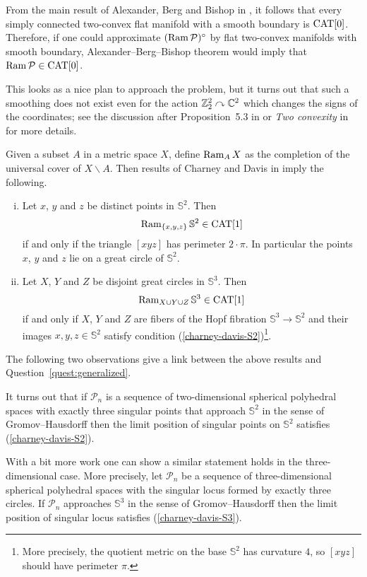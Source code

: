 \documentclass[oneside,a4paper]{article}
\begin{document}
From the main result of Alexander, Berg and Bishop  in \cite{ABB},
it follows that every simply connected two-convex flat manifold with a smooth boundary is $\mathrm{CAT}[0]$. Therefore, if one could approximate  $(\mathop{\rm Ram}\nolimits  \mathcal{P})^\circ$ by flat two-convex manifolds with smooth boundary, Alexander--Berg--Bishop theorem would imply that $\Ram  \mathcal{P}\z\in\CAT[0]$.

This looks as a nice plan to approach the problem, but it turns out that such a smoothing does not exist even for the action $\mathbb{Z}_2^2\curvearrowright\mathbb{C}^2$ which changes the signs of the coordinates;
see the discussion after Proposition~5.3 in \cite{panov-petrunin}
or \emph{Two convexity} in \cite{petrunin-orthodox} for more details.

Given a subset $A$ in a metric space $X$,
define $\mathop{\rm Ram}\nolimits_A X$ as  the completion of the universal cover of $X\backslash A$.
Then results of  Charney and Davis in \cite{charney-davis-93} imply the following.
\begin{enumerate}[(i)]
\item\label{charney-davis-S2} Let $x$, $y$ and $z$ be distinct points in $\mathbb{S}^2$.
Then
$$\mathop{\rm Ram}\nolimits_{\{x,y,z\}}\mathbb{S}^2\in \mathrm{CAT}[1]$$
if and only if the triangle $[xyz]$ has perimeter $2\cdot\pi$.
In particular the points $x$, $y$ and $z$ lie on a great circle of $\mathbb{S}^2$.
\item\label{charney-davis-S3}
Let $X$, $Y$ and $Z$ be disjoint great circles in $\mathbb{S}^3$.
Then
$$\mathop{\rm Ram}\nolimits_{X\cup Y\cup Z}\mathbb{S}^3\in\mathrm{CAT}[1]$$ if and only if $X$, $Y$ and $Z$ are fibers of the Hopf fibration $\mathbb{S}^3\to \mathbb{S}^2$ and their images $x,y,z\in \mathbb{S}^2$ satisfy condition (\ref{charney-davis-S2})\footnote{More precisely, the  quotient metric on the base $\mathbb{S}^2$ has curvature $4$, so $[xyz]$ should have perimeter $\pi$.}.
\end{enumerate}

The following two observations give a link between the above results and Question~\ref{quest:generalized}.

It turns out that if $\mathcal{P}_n$ is a sequence of two-dimensional spherical polyhedral spaces with exactly three singular points that approach $\mathbb{S}^2$ in the sense of Gromov--Hausdorff then
the limit position of singular points on $\mathbb{S}^2$ satisfies (\ref{charney-davis-S2}).

With a bit more work one can show a similar statement holds in the three-dimensional case.
More precisely, let $\mathcal{P}_n$ be a sequence of three-dimensional spherical polyhedral spaces with the singular locus formed by exactly three circles.
If $\mathcal{P}_n$ approaches $\mathbb{S}^3$ in the sense of Gromov--Hausdorff then the limit position of singular locus  satisfies (\ref{charney-davis-S3}).
\end{document}
